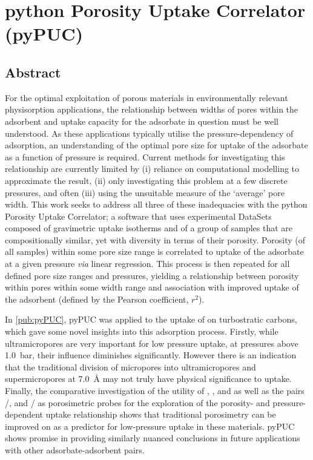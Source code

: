 \chapter{python Porosity Uptake Correlator (pyPUC)}
\label{ch:pyPUC}

\newpage
\section*{Abstract}
For the optimal exploitation of porous materials in environmentally relevant \gls{physisorption} applications, the relationship between widths of pores within the \gls{adsorbent} and uptake capacity for the \gls{adsorbate} in question must be well understood. As these applications typically utilise the pressure-dependency of \gls{adsorption}, an understanding of the optimal pore size for uptake of the \gls{adsorbate} as a function of pressure is required. Current methods for investigating this relationship are currently limited by (i) reliance on computational modelling to approximate the result, (ii) only investigating this problem at a few discrete pressures, and often (iii) using the unsuitable measure of the `average' pore width. This work seeks to address all three of these inadequacies with the python Porosity Uptake Correlator; a software that uses experimental DataSets composed of gravimetric uptake isotherms and  of a group of samples that are compositionally similar, yet with diversity in terms of their porosity. Porosity (of all samples) within some pore size range is correlated to uptake of the \gls{adsorbate} at a given pressure \textit{via} linear regression. This process is then repeated for all defined pore size ranges and pressures, yielding a relationship between porosity within pores within some width range and association with improved uptake of the \gls{adsorbent} (defined by the Pearson coefficient, $r^2$).

In \ref{pub:pyPUC}, pyPUC was applied to the uptake of  on \glspl{turbostratic carbon}, which gave some novel insights into this \gls{adsorption} process. Firstly, while \glspl{ultramicropore} are very important for low pressure  uptake, at pressures above \qty{1.0}{\bar}, their influence diminishes significantly. However there is an indication that the traditional division of \glspl{micropore} into \glspl{ultramicropore} and \glspl{supermicropore} at \qty{7.0}{\angstrom} may not truly have physical significance to  uptake. Finally, the comparative investigation of the utility of , , and  as well as the pairs /, and / as porosimetric probes for the exploration of the porosity- and pressure-dependent  uptake relationship shows that traditional  porosimetry can be improved on as a predictor for low-pressure  uptake in these materials. pyPUC shows promise in providing similarly nuanced conclusions in future applications with other \gls{adsorbate}-\gls{adsorbent} pairs.

